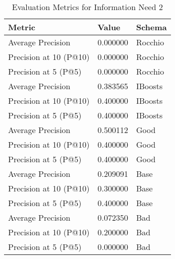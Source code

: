 \begingroup
    \renewcommand{\arraystretch}{2} %
    \begin{table}[!h]
        \centering
        \begin{tabular}{l | l | l}
            Metric & Value & Schema \\
            \hline
            Average Precision & 0.000000 & Rocchio \\
            Precision at 10 (P@10) & 0.000000 & Rocchio \\
            Precision at 5 (P@5) & 0.000000 & Rocchio \\
            \hline
            Average Precision & 0.383565 & IBoosts \\
            Precision at 10 (P@10) & 0.400000 & IBoosts \\
            Precision at 5 (P@5) & 0.400000 & IBoosts \\
            \hline
            Average Precision & 0.500112 & Good \\
            Precision at 10 (P@10) & 0.400000 & Good \\
            Precision at 5 (P@5) & 0.400000 & Good \\
            \hline
            Average Precision & 0.209091 & Base\\
            Precision at 10 (P@10) & 0.300000 & Base\\
            Precision at 5 (P@5) & 0.400000 & Base\\
            \hline
            Average Precision & 0.072350 & Bad\\
            Precision at 10 (P@10) & 0.200000 & Bad\\
            Precision at 5 (P@5) & 0.000000 & Bad\\
        \end{tabular}
        \caption{Evaluation Metrics for Information Need 2}
        \label{tab:metrics-info-2-2}
    \end{table}
\endgroup

